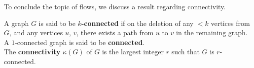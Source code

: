 			To conclude the topic of flows, we discuss a result regarding connectivity.

			\begin{fdef}
				A graph $G$ is said to be \textbf{$k$-connected} if on the deletion of any $<k$ vertices from $G$, and any vertices $u$, $v$, there exists a path from $u$ to $v$ in the remaining graph.
				A $1$-connected graph is said to be \textbf{connected}. \\
				The \textbf{connectivity} $\kappa(G)$ of $G$ is the largest integer $r$ such that $G$ is $r$-connected.
			\end{fdef}